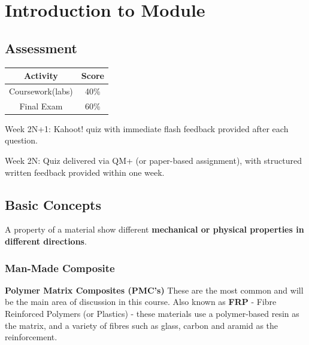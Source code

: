 \documentclass{NoteThesis/note-thesis}
\begin{document}
\maketitle

\tableofcontents

\newpage

\section{Introduction to Module}

\subsection*{Assessment}

\begin{table}[h]
    \centering
    \begin{tabular}{cc}
        \hline
        Activity & Score\\
        \hline
        Coursework(labs) & 40\%\\
        Final Exam & 60\%\\ 
        \hline
    \end{tabular}
\end{table}

Week 2N+1: Kahoot! quiz with immediate flash feedback provided after each question.

Week 2N: Quiz delivered via QM+ (or paper-based assignment), with structured written feedback provided within one week.

\subsection{Basic Concepts}

\begin{mynote_env}[frametitle=Anisotropy]
    A property of a material show different \textbf{mechanical or physical properties in different directions}.
\end{mynote_env}

\subsubsection*{Man-Made Composite}

\textbf{Polymer Matrix Composites (PMC's)} These are the most common and will be the main
area of discussion in this course. Also known as \textbf{FRP} - Fibre Reinforced Polymers (or Plastics) - these materials use a polymer-based resin as the matrix, and a variety of fibres such as glass, carbon and aramid as the reinforcement.
\end{document}
